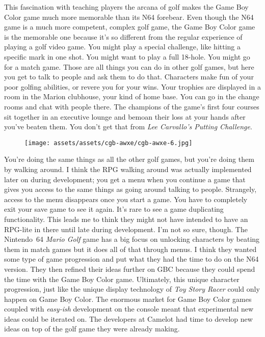 \documentclass{book}
\begin{document}
This fascination with teaching players the arcana of golf makes the Game Boy Color game much more memorable than its N64 forebear. Even though the N64 game is a much more competent, complex golf game, the Game Boy Color game is the memorable one because it’s so different from the regular experience of playing a golf video game. You might play a special challenge, like hitting a specific mark in one shot. You might want to play a full 18-hole. You might go for a match game. Those are all things you can do in other golf games, but here you get to talk to people and ask them to do that. Characters make fun of your poor golfing abilities, or revere you for your wins. Your trophies are displayed in a room in the Marion clubhouse, your kind of home base. You can go in the change rooms and chat with people there. The champions of the game’s first four courses sit together in an executive lounge and bemoan their loss at your hands after you’ve beaten them. You don’t get that from \emph{Lee Carvallo’s Putting Challenge}.

\begin{figure}[hbt]
\vskip 10pt
\centering \texttt{[image: assets/assets/cgb-awxe/cgb-awxe-6.jpg]}
\vskip 6pt
\end{figure}
You’re doing the same things as all the other golf games, but you’re doing them by walking around. I think the RPG walking around was actually implemented later on during development; you get a menu when you continue a game that gives you access to the same things as going around talking to people. Strangely, access to the menu disappears once you start a game. You have to completely exit your save game to see it again. It’s rare to see a game duplicating functionality. This leads me to think they might not have intended to have an RPG-lite in there until late during development. I’m not so sure, though. The Nintendo 64 \emph{Mario Golf} game has a big focus on unlocking characters by beating them in match games but it does all of that through menus. I think they wanted some type of game progression and put what they had the time to do on the N64 version. They then refined their ideas further on GBC because they could spend the time with the Game Boy Color game. Ultimately, this unique character progression, just like the unique display technology of \emph{Toy Story Racer} could only happen on Game Boy Color. The enormous market for Game Boy Color games coupled with \emph{easy-ish} development on the console meant that experimental new ideas could be iterated on. The developers at Camelot had time to develop new ideas on top of the golf game they were already making.
\end{document}
